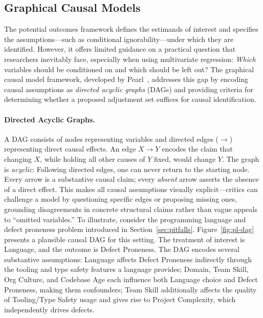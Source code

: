 \subsection{Graphical Causal Models}

The potential outcomes framework defines the estimands of interest and specifies the assumptions---such as conditional ignorability---under which they are identified.
However, it offers limited guidance on a practical question that researchers inevitably face, especially when using multivariate regression: \emph{Which} variables should be conditioned on and which should be left out?
The graphical causal model framework, developed by Pearl~\cite{pearl2009causality}, addresses this gap by encoding causal assumptions as \emph{directed acyclic graphs} (DAGs) and providing criteria for determining whether a proposed adjustment set suffices for causal identification.

\paragraph{Directed Acyclic Graphs.}
A DAG consists of nodes representing variables and directed edges ($\to$) representing direct causal effects.
An edge $X \to Y$ encodes the claim that changing $X$, while holding all other causes of $Y$ fixed, would change $Y$.
The graph is \emph{acyclic}: Following directed edges, one can never return to the starting node.
Every arrow is a substantive causal claim; every \emph{absent} arrow asserts the absence of a direct effect.
This makes all causal assumptions visually explicit---critics can challenge a model by questioning specific edges or proposing missing ones, grounding disagreements in concrete structural claims rather than vague appeals to ``omitted variables.''
To illustrate, consider the programming language and defect proneness problem introduced in Section~\ref{sec:pitfalls}.
Figure~\ref{fig:pl-dag} presents a plausible causal DAG for this setting.
The treatment of interest is Language, and the outcome is Defect Proneness.
The DAG encodes several substantive assumptions: Language affects Defect Proneness indirectly through the tooling and type safety features a language provides; Domain, Team Skill, Org Culture, and Codebase Age each influence both Language choice and Defect Proneness, making them confounders; Team Skill additionally affects the quality of Tooling/Type Safety usage and gives rise to Project Complexity, which independently drives defects.

